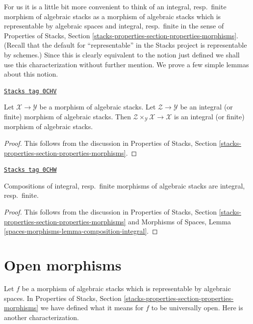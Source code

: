 For us it is a little bit more convenient to think of an
integral, resp.\ finite morphism of algebraic stacks as a
morphism of algebraic stacks which is
representable by algebraic spaces and integral, resp.\ finite
in the sense of Properties of Stacks, Section
\ref{stacks-properties-section-properties-morphisms}.
(Recall that the default for ``representable'' in the Stacks project
is representable by schemes.)
Since this is clearly equivalent to the notion just defined we shall
use this characterization without further mention.
We prove a few simple lemmas about this notion.

\begin{lemma}
\label{stacks-morphisms-lemma-base-change-integral}
\href{https://stacks.math.columbia.edu/tag/0CHV}{\texttt{Stacks tag 0CHV}}

Let $\mathcal{X} \to \mathcal{Y}$ be a morphism of algebraic stacks.
Let $\mathcal{Z} \to \mathcal{Y}$ be an integral (or finite)
morphism of algebraic stacks. Then
$\mathcal{Z} \times_\mathcal{Y} \mathcal{X} \to \mathcal{X}$
is an integral (or finite) morphism of algebraic stacks.
\end{lemma}

\begin{proof}
This follows from the discussion in
Properties of Stacks, Section
\ref{stacks-properties-section-properties-morphisms}.
\end{proof}

\begin{lemma}
\label{stacks-morphisms-lemma-composition-integral}
\href{https://stacks.math.columbia.edu/tag/0CHW}{\texttt{Stacks tag 0CHW}}

Compositions of integral, resp.\ finite morphisms of algebraic stacks
are integral, resp.\ finite.
\end{lemma}

\begin{proof}
This follows from the discussion in
Properties of Stacks, Section
\ref{stacks-properties-section-properties-morphisms}
and
Morphisms of Spaces, Lemma \ref{spaces-morphisms-lemma-composition-integral}.
\end{proof}

\section{Open morphisms}
\label{stacks-morphisms-section-open}
Let $f$ be a morphism of algebraic stacks which is representable by
algebraic spaces. In
Properties of Stacks, Section
\ref{stacks-properties-section-properties-morphisms}
we have defined what it means for $f$ to be universally open.
Here is another characterization.


